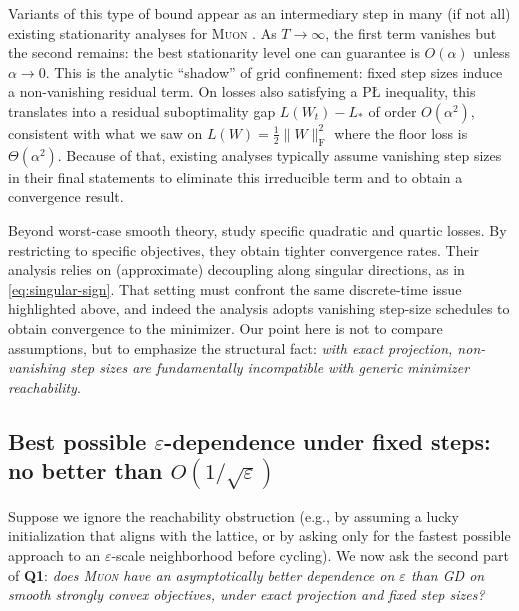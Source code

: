 \documentclass{article}
\theoremstyle{plain}
\theoremstyle{definition}
\theoremstyle{remark}
\newcommand{\loss}{L}
\newcommand{\stepsize}{\alpha}
\newcommand{\GD}{\textsc{GD}}
\newcommand{\Muon}{\textsc{Muon}}
\newcommand{\eps}{\varepsilon}
\begin{document}
Variants of this type of bound appear as an intermediary step 
in many (if not all) existing stationarity analyses for \Muon{} 
\cite{pethick2025normconstrainedlmo,
li2025noteconvergencemuon,shen2025convergencemuon,
chen2025muonspectralnorm,kovalev2025understandinggo,
riabinin2025gluon,gruntkowska2025ef21muon,sato2025muonconvergence,
shulgin2025beyondideal,anon2025newtonschulz,lau2025polargrad,nagashima2026improvedconvergenceratesmuon}. 
As $T\to\infty$, the first term vanishes but the second remains: the best stationarity level one can guarantee is $O(\stepsize)$ unless $\stepsize\to 0$.
This is the analytic ``shadow'' of grid confinement: fixed step sizes induce a non-vanishing residual term.  
On losses also satisfying a P\L{} inequality, 
this translates into a residual suboptimality gap $L(W_t)-L_\ast$ of order $O(\stepsize^2)$, consistent with what we 
saw 
on $\loss(W)=\frac12\|W\|_{\mathrm{F}}^2$ where the floor loss is $\Theta(\stepsize^2)$. 
Because of that, 
existing analyses typically assume vanishing step sizes 
in their final statements to eliminate this irreducible term and to obtain a convergence result.

Beyond worst-case smooth theory, 
\citet{ma2026preconditioningbenefitsspectralorthogonalization} 
study specific quadratic and quartic losses. 
By restricting to specific objectives, 
they obtain tighter convergence rates. 
Their analysis relies on (approximate) decoupling along singular directions, as in \eqref{eq:singular-sign}. 
That setting must confront the same discrete-time issue highlighted above, and indeed the analysis adopts vanishing step-size schedules to obtain convergence to the minimizer.
Our point here is not to compare assumptions, but to emphasize the structural fact:
\emph{with exact projection, non-vanishing step sizes 
are fundamentally incompatible with generic minimizer reachability}.

\subsection{Best possible $\eps$-dependence under fixed steps: no better than $O(1/\sqrt{\eps})$}
\label{sec:setup-eps}

Suppose we ignore the reachability obstruction (e.g., by assuming a lucky initialization that aligns with the lattice, or by asking only for the fastest possible approach to an $\eps$-scale neighborhood before cycling).
We now ask the second part of \textbf{Q1}:
\emph{does \Muon{} have an asymptotically better dependence on $\eps$ than \GD{} on smooth strongly convex objectives, under exact projection and fixed step sizes?}
\end{document}
